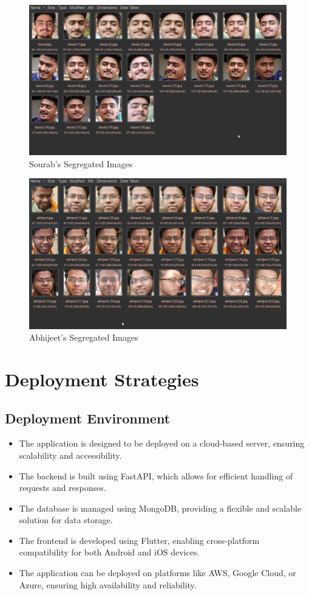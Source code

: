 \documentclass[openany]{report}
\begin{document}
\begin{figure}[H]
    \centering
    \includegraphics[width=.95\textwidth]{../imgs/sourab.png}
    \caption{Sourab's Segregated Images}
\end{figure}

\begin{figure}[H]
    \centering
    \includegraphics[width=.95\textwidth]{../imgs/abhijeet.png}
    \caption{Abhijeet's Segregated Images}
\end{figure}


\chapter{Deployment Strategies}

\section{Deployment Environment}
\begin{itemize}
    \item The application is designed to be deployed on a cloud-based server, ensuring scalability and accessibility.
    \item The backend is built using FastAPI, which allows for efficient handling of requests and responses.
    \item The database is managed using MongoDB, providing a flexible and scalable solution for data storage.
    \item The frontend is developed using Flutter, enabling cross-platform compatibility for both Android and iOS devices.
    \item The application can be deployed on platforms like AWS, Google Cloud, or Azure, ensuring high availability and reliability.
\end{itemize}
\end{document}
